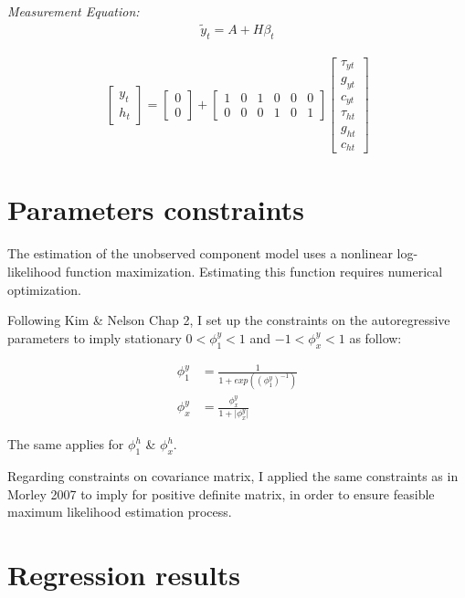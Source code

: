 \documentclass[fleqn]{article}
\begin{document}
\begin{outline}[enumerate]
\textit{Measurement Equation:}
\begin{align}
\tilde{y}_t = A + H\beta_t
\end{align}

\begin{align*}
\begin{bmatrix}
y_t	\\
h_t
\end{bmatrix}
=
\begin{bmatrix}
0	\\
0
\end{bmatrix}
+
\begin{bmatrix}
1	& 0	& 1	& 0	& 0 & 0 \\
0	& 0 & 0 & 1 & 0 & 1
\end{bmatrix}
\begin{bmatrix}
\tau_{yt}	\\
g_{yt}		\\
c_{yt}	\\
\tau_{ht}	\\
g_{ht}		\\
c_{ht}
\end{bmatrix}
\end{align*}
\pagebreak
\section{Parameters constraints}

The estimation of the unobserved component model uses a nonlinear log-likelihood function maximization. Estimating this function requires numerical optimization.


Following Kim \& Nelson Chap 2, I set up the constraints on the autoregressive parameters to imply stationary $0<\phi^{y}_{1}<1$ and $-1<\phi^{y}_{x}<1$ as follow:

\begin{align*}
\phi^{y}_{1} &= \frac{1}{1+exp((\phi^{y}_{1})^{-1})}
\\
\phi^{y}_{x} &= \frac{\phi^{y}_{x}}{1+|{\phi^{y}_{x}|}}
\end{align*}

The same applies for $\phi^{h}_{1}$ \& $\phi^{h}_{x}$.
\vspace{5mm} %

Regarding constraints on covariance matrix, I applied the same constraints as in Morley 2007 to imply for positive definite matrix, in order to ensure feasible maximum likelihood estimation process.

\section{Regression results}


\end{outline}
\end{document}
